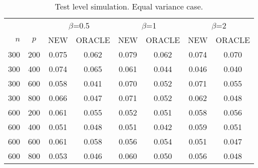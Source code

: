 \begin{table}[ht]

\caption{Test level simulation. Equal variance case.} 
\label{biaoge1}
    \vspace{3mm}
\centering
\begin{tabular}{rccccccc}
    \toprule
     &  & \multicolumn{2}{c}{$\beta$=0.5} & \multicolumn{2}{c}{$\beta$=1}& \multicolumn{2}{c}{$\beta$=2}   \\
    \cmidrule(r){3-4}
    \cmidrule(r){5-6}
    \cmidrule(r){7-8}
$n$ & $p$ & NEW & ORACLE & NEW & ORACLE & NEW & ORACLE \\ 
\midrule
300 & 200 & 0.075 & 0.062 & 0.079 & 0.062 & 0.074 & 0.070 \\ 
  300 & 400 & 0.074 & 0.065 & 0.061 & 0.044 & 0.046 & 0.040 \\ 
  300 & 600 & 0.058 & 0.041 & 0.070 & 0.052 & 0.071 & 0.055 \\ 
  300 & 800 & 0.066 & 0.047 & 0.071 & 0.052 & 0.062 & 0.048 \\ 
  600 & 200 & 0.061 & 0.055 & 0.052 & 0.051 & 0.058 & 0.056 \\ 
  600 & 400 & 0.051 & 0.048 & 0.051 & 0.042 & 0.059 & 0.051 \\ 
  600 & 600 & 0.061 & 0.058 & 0.056 & 0.054 & 0.051 & 0.047 \\ 
  600 & 800 & 0.053 & 0.046 & 0.060 & 0.050 & 0.056 & 0.048 \\ 
   \bottomrule
\end{tabular}
\end{table}

